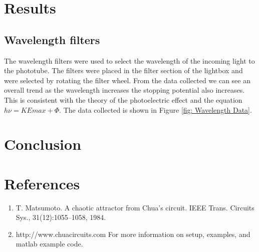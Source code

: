 \documentclass[12pt]{article}
\begin{document}
\section{Results}
        \subsection{Wavelength filters}
        The wavelength filters were used to select the wavelength of the incoming light to the phototube. The filters were
        placed in the filter section of the lightbox and were selected by rotating the filter wheel. From the data collected
        we can see an overall trend as the wavelength increases the stopping potential also increases. This is consistent with
        the theory of the photoelectric effect and the equation \( h\nu = KEmax + \Phi \). The data collected is shown in Figure \ref{fig: Wavelength Data}.
        


\section{Conclusion}


\section{References}
    \begin{enumerate}
        \sloppy
        \item  T. Matsumoto. A chaotic attractor from Chua’s circuit. IEEE Trans. Circuits Sys., 31(12):1055–1058, 1984.
        \item  http://www.chuacircuits.com For more information on setup, examples, and matlab example code.

    \end{enumerate}
\end{document}
